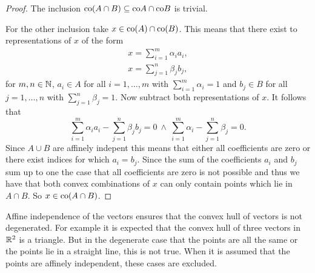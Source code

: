 \begin{proof}
  The inclusion ${\rm co}(A\cap B) \subseteq {\rm co}A \cap {\rm co}B$ is trivial.

  For the other inclusion take $x \in {\rm co}(A) \cap {\rm co}(B)$. This means that there exist to representations of $x$ of the form
  \begin{align*}
    x = \sum\limits_{i=1}^m\alpha_i a_i, \\
    x = \sum\limits_{j=1}^n\beta_j b_j,
  \end{align*}
  for $m,n \in \mathbb{N}$, $a_i \in A$ for all $i = 1, \ldots, m$ with $\sum\limits_{i=1}^m \alpha_i = 1$ and $b_j \in B$ for all $j =1, \ldots,n$ with $\sum\limits_{j=1}^n\beta_j = 1$.
  Now subtract both representations of $x$. It follows that
  \begin{equation*}
    \sum\limits_{i=1}^m\alpha_i a_i - \sum\limits_{j=1}^n\beta_j b_j = 0 \: \land \: \sum\limits_{i=1}^m \alpha_i - \sum\limits_{j=1}^n\beta_j = 0.
  \end{equation*}
  Since $A \cup B$ are affinely indepent this means that either all coefficients are zero or there exist indices for which $a_i = b_j$. Since the sum of the coefficients $a_i$ and $b_j$ sum up to one the case that all coefficients are zero is not possible and thus we have that both convex combinations of $x$ can only contain points which lie in $A \cap B$. So $x \in {\rm co}(A\cap B)$.
\end{proof}

Affine independence of the vectors ensures that the convex hull of vectors is not degenerated.
For example it is expected that the convex hull of three vectors in $\mathbb{R}^2$ is a triangle. But in the degenerate case that the points are all the same
or the points lie in a straight line, this is not true. When it is assumed that the points are affinely independent, these cases are excluded. 

